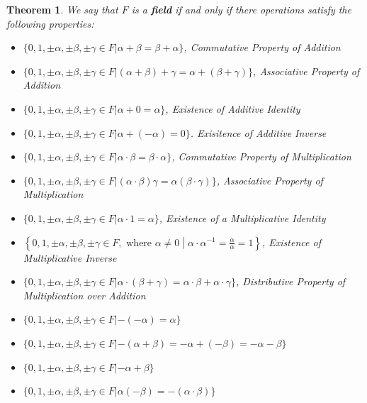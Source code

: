 \documentclass{book}
\newtheorem{theorem}{Theorem}[section]
\theoremstyle{definition}
\theoremstyle{remark}
\newcommand{\m}{\cdot}
\begin{document}
\begin{theorem}
    
    We say that $F$ is a \textbf{field} if and only if there operations satisfy the following properties: 
        \begin{itemize}
            \item $\{ 0, 1, \pm \alpha, \pm \beta, \pm \gamma \in F  | \alpha + \beta = \beta + \alpha \}$, \textit{Commutative Property of Addition}
            \item $\{ 0, 1, \pm \alpha, \pm \beta, \pm \gamma \in F  | (\alpha + \beta) + \gamma = \alpha + (\beta + \gamma) \}$, \textit{Associative Property of Addition}
            \item $\{ 0, 1, \pm \alpha, \pm \beta, \pm \gamma \in F  | \alpha + 0 = \alpha \}$, \textit{Existence of Additive Identity}
            \item $\{ 0, 1, \pm \alpha, \pm \beta, \pm \gamma \in F  | \alpha + (- \alpha) = 0 \}$. \textit{Exisitence of Additive Inverse}
            \item $\{ 0, 1, \pm \alpha, \pm \beta, \pm \gamma \in F  | \alpha \m \beta = \beta \m \alpha \}$, \textit{Commutative Property of Multiplication}
            \item $\{ 0, 1, \pm \alpha, \pm \beta, \pm \gamma \in F  | (\alpha \m \beta) \gamma = \alpha (\beta \m \gamma) \}$, \textit{Associative Property of Multiplication}
            \item $\{ 0, 1, \pm \alpha, \pm \beta, \pm \gamma \in F  | \alpha \m 1 = \alpha \}$, \textit{Existence of a Multiplicative Identity}
            \item $\left \{ 0, 1, \pm \alpha, \pm \beta, \pm \gamma \in F ,  \text{ where } \alpha \neq 0 \middle | \alpha \m {\alpha}^{-1} = \frac{\alpha}{\alpha} = 1 \right \}$, \textit{Existence of Multiplicative Inverse}
            \item $\{ 0, 1, \pm \alpha, \pm \beta, \pm \gamma \in F  | \alpha \m (\beta + \gamma) = \alpha \m \beta + \alpha \m \gamma \}$, \textit{Distributive Property of Multiplication over Addition} \footnotemark 
            \item $\{ 0, 1, \pm \alpha, \pm \beta, \pm \gamma \in F  | -(- \alpha) = \alpha \}$
            \item $\{ 0, 1, \pm \alpha, \pm \beta, \pm \gamma \in F  | -(\alpha + \beta) = - \alpha + (- \beta) = - \alpha - \beta \}$
            \item $\{ 0, 1, \pm \alpha, \pm \beta, \pm \gamma \in F  | - \alpha + \beta \}$
            \item $\{ 0, 1, \pm \alpha, \pm \beta, \pm \gamma \in F  | \alpha( - \beta) = - (\alpha \m \beta)\}$         

\end{itemize}
\end{theorem}
\end{document}
